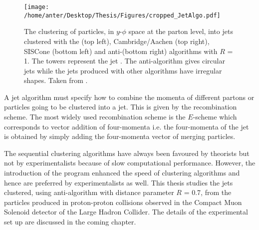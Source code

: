 \begin{figure}[!h]
\begin{center}
\hspace*{-15mm}
\texttt{[image: /home/anter/Desktop/Thesis/Figures/cropped\_JetAlgo.pdf]}\\
\vspace*{4mm}
\caption[The clustering of particles into jets using different jet algorithms.]{The clustering of particles, in $y$-$\phi$ space at the parton level, into jets clustered with the \kt (top left), Cambridge/Aachen (top right), SISCone (bottom left) and anti-\kt (bottom right) algorithms with $R$ = 1. The towers represent the jet \pt. The anti-\kt algorithm gives circular jets while the jets produced with other algorithms have irregular shapes. Taken from \cite{Salam:2009jx}.}
\label{fig:jet_algo}
\end{center}
\end{figure}

A jet algorithm must specify how to combine the momenta of different partons or particles going to be clustered into a jet. This is given by the recombination scheme. The most widely used recombination scheme is the $E$-scheme \cite{Blazey:2000qt} which corresponds to vector addition of four-momenta i.e. the four-momenta of the jet is obtained by simply adding the four-momenta vector of merging particles.
 
The sequential clustering algorithms have always been favoured by theorists but not by experimentalists because of slow computational performance. However, the introduction of the \fastjet program \cite{Cacciari:2011ma} enhanced the speed of clustering algorithms and hence are preferred by experimentalists as well. This thesis studies the jets clustered, using anti-\kt algorithm with distance parameter $R$ = 0.7, from the particles produced in proton-proton collisions observed in the Compact Muon Solenoid detector of the Large Hadron Collider. The details of the experimental set up are discussed in the coming chapter.
\cleardoublepage
